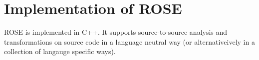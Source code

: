 
\begin{comment}
\begin{latexonly}
\begin{figure}[tb]
\texttt{[image: roseDirectoryMap]}
\caption{Directory structure of ROSE project.}
\end{figure}
\end{latexonly}

\begin{htmlonly}
\begin{figure}[tb]

\texttt{[image: roseDirectoryMap]}
\caption{Directory structure of ROSE project.  This figure is formed from a Perl script
    ({\tt ROSE/scripts/lsvis}) which generates the graph when the documentation is built.}
\label{designAndImplementation:directoryStructure}
\end{figure}
\end{htmlonly}

\end{comment}

\section{Implementation of ROSE}
   ROSE is implemented in C++.  It supports source-to-source
analysis and transformations on source code in a language neutral
way (or alternativeively in a collection of langauge specific ways).

